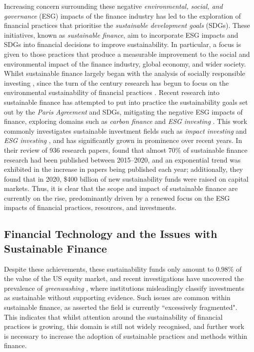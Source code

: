 \documentclass[a4paper, 11pt]{report}
\begin{document}
    Increasing concern surrounding these negative \emph{environmental, social, and governance} (ESG) impacts of the finance industry has led to the exploration of financial practices that prioritise the \emph{sustainable development goals} (SDGs). These initiatives, known as \emph{sustainable finance}, aim to incorporate ESG impacts and SDGs into financial decisions to improve sustainability. In particular, a focus is given to those practices that produce a measurable improvement to the social and environmental impact of the finance industry, global economy, and wider society. Whilst sustainable finance largely began with the analysis of socially responsible investing \citep{ferris-1986}, since the turn of the century research has begun to focus on the environmental sustainability of financial practices \citep{laan-2004}. Recent research into sustainable finance has attempted to put into practice the sustainability goals set out by the \emph{Paris Agreement} and SDGs, mitigating the negative ESG impacts of finance, exploring domains such as \emph{carbon finance} \citep{aglietta-2015} and \emph{ESG investing} \citep{alessandrini-2020}. This work commonly investigates sustainable investment fields such as \emph{impact investing} \citep{agrawal-2021} and \emph{ESG investing} \citep{alessandrini-2020}, and has significantly grown in prominence over recent years. In their review of $936$ research papers, \citet{kumar-2022} found that almost $70\%$ of sustainable finance research had been published between 2015--2020, and an exponential trend was exhibited in the increase in papers being published each year; additionally, they found that in 2020, \$400 billion of new sustainability funds were raised on capital markets. Thus, it is clear that the scope and impact of sustainable finance are currently on the rise, predominantly driven by a renewed focus on the ESG impacts of financial practices, resources, and investments.


    \subsection{Financial Technology and the Issues with Sustainable Finance}
    
    Despite these achievements, these sustainability funds only amount to $0.98\%$ of the value of the US equity market, and recent investigations have uncovered the prevalence of \emph{greenwashing} \citep{popescu-2021}, where institutions misleadingly classify investments as sustainable without supporting evidence. Such issues are common within sustainable finance, as \citet{cunha-2021} asserted the field is currently ``excessively fragmented". This indicates that whilst attention around the sustainability of financial practices is growing, this domain is still not widely recognised, and further work is necessary to increase the adoption of sustainable practices and methods within finance. 
\end{document}
